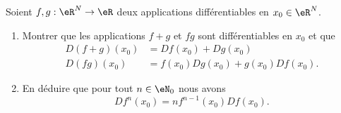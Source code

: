 \begin{exercice}\label{exoCalculDifferentiel0015}

Soient $f, g : \eR ^N \to \eR$ deux applications différentiables en $x_0 \in \eR ^N$.
\begin{enumerate}
	\item
		Montrer que les applications $f+g$ et $fg$ sont différentiables en $x_0$ et que
		\begin{subequations}
			\begin{align}
				D(f+g) (x_0) &= Df(x_0) + Dg(x_0)\\
				D(fg)(x_0) &= f(x_0)Dg(x_0) + g(x_0)Df(x_0).
			\end{align}
		\end{subequations}
\item
	En déduire que pour tout $n \in \eN_0$ nous avons
	\begin{equation}
		Df^n (x_0) = n f^{n-1} (x_0) Df(x_0).	
	\end{equation}
		
\end{enumerate}


\end{exercice}
